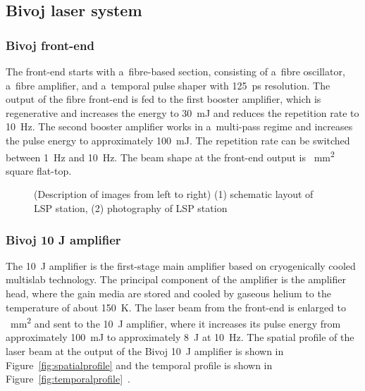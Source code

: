\subsection{Bivoj laser system}

\subsubsection*{Bivoj front-end}

The front-end starts with a~fibre-based section, consisting
of a~fibre oscillator, a~fibre amplifier, and a~temporal pulse shaper
with \SI{125}{\ps} resolution. The output of the fibre front-end is fed
to the first booster amplifier, which is regenerative and
increases the energy to \SI{30}{\milli\joule} and reduces the repetition rate to \SI{10}{\hertz}. The second booster amplifier works in a~multi-pass regime
and increases the pulse energy to approximately \SI{100}{\milli\joule}.
The repetition rate can be switched between \SI{1}{\hertz} and \SI{10}{\hertz}. The 
beam shape at the front-end output is  \SI{}{\mm\squared} square flat-top.

\begin{figure}[H]
\begin{center}
  \hspace{1cm}
  \caption[Schematic layout of LSP station and photography of LSP station]
    {(Description of images from left to right) (1) schematic layout of LSP station, (2) photography of LSP station~\cite{bohm_kaufman_brajer_rostohar_2019}}
  \label{fig:lsplayout}
\end{center}
\end{figure}

\subsubsection*{Bivoj 10 J amplifier}

The \SI{10}{\joule}  amplifier is the first-stage main amplifier based on
cryogenically cooled multislab technology. The principal
component of the amplifier is the amplifier head, where the
gain media are stored and cooled by gaseous helium to 
the temperature of about \SI{150}{\kelvin}. The laser beam from the front-end
is enlarged to  \SI{}{\mm\squared} and sent to the \SI{10}{\joule} amplifier, where it
increases its pulse energy from approximately \SI{100}{\milli\joule} to
approximately \SI{8}{\joule} at \SI{10}{\hertz}. The spatial profile of the laser beam at the output of the Bivoj \SI{10}{\joule} amplifier is shown in Figure~\ref{fig:spatialprofile} and the temporal profile is shown in Figure~\ref{fig:temporalprofile}~\cite{saumyabrata}.

